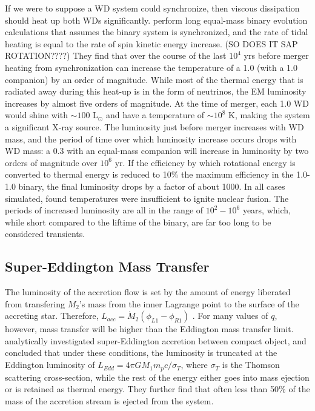 If we were to suppose a WD system could synchronize, then viscous dissipation should heat up both WDs significantly.  \cite{ibentf98} perform long equal-mass binary evolution calculations that assumes the binary system is synchronized, and the rate of tidal heating is equal to the rate of spin kinetic energy increase. (SO DOES IT SAP ROTATION????)  They find that over the course of the last $10^4$ yrs before merger heating from synchronization can increase the temperature of a 1.0 {\Msun} (with a 1.0 {\Msun} companion) by an order of magnitude.  While most of the thermal energy that is radiated away during this heat-up is in the form of neutrinos, the EM luminosity increases by almost five orders of magnitude.  At the time of merger, each 1.0 {\Msun} WD would shine with $\sim 100$ L$_{\odot}$ and have a temperature of $\sim 10^8$ K, making the system a significant X-ray source.  The luminosity just before merger increases with WD mass, and the period of time over which luminosity increase occurs drops with WD mass: a 0.3 {\Msun} with an equal-mass companion will increase in luminosity by two orders of magnitude over $10^6$ yr.  If the efficiency by which rotational energy is converted to thermal energy is reduced to 10\% the maximum efficiency in the 1.0-1.0 {\Msun} binary, the final luminosity drops by a factor of about 1000.  In all cases simulated, \citeauthor{ibentf98} found temperatures were insufficient to ignite nuclear fusion.  The periods of increased luminosity are all in the range of $10^2 - 10^6$ years, which, while short compared to the liftime of the binary, are far too long to be considered transients.

\subsection{Super-Eddington Mass Transfer}
\label{ssec:super-eddingtonmasstransfer}

The luminosity of the accretion flow is set by the amount of energy liberated from transfering $M_2$'s mass from the inner Lagrange point to the surface of the accreting star.  Therefore, $L_{acc} = \dot{M}_2(\phi_{L1} - \phi_{R1})$  \citep{hanw99}.  For many values of $q$, however, mass transfer will be higher than the Eddington mass transfer limit.  \citeauthor{hanw99} analytically investigated super-Eddington accretion between compact object, and concluded that under these conditions, the luminosity is truncated at the Eddington luminosity of $L_{Edd} = 4{\pi}GM_1m_pc/\sigma_T$, where $\sigma_T$ is the Thomson scattering cross-section, while the rest of the energy either goes into mass ejection or is retained as thermal energy.  They further find that often less than 50\% of the mass of the accretion stream is ejected from the system.

